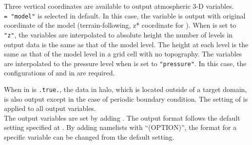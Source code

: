 Three vertical coordinates are available to output atmospheric 3-D variables.\\
 \verb|= "model"| is selected in default.
In this case, the variable is output with original coordinate of the model (terrain-following, z* coordinate for \scalerm).
When  is set to \verb|"z"|, the variables are interpolated to absolute height
the number of levels in output data is the same as that of the model level.
The height at each level is the same as that of the model level in a grid cell with no topography.
The variables are interpolated to the pressure level when  is set to \verb|"pressure"|.
In this case, the configurations of  and  in  are required.

When  in  is \verb|.true.|,
the data in halo, which is located outside of a target domain, is also output except in the case of periodic boundary condition.
The setting of  is applied to all output variables.\\

The output variables are set by adding .
The output format follows the default setting specified at .
By adding namelists with ``(OPTION)'', the format for a specific variable can be changed from the default setting.


